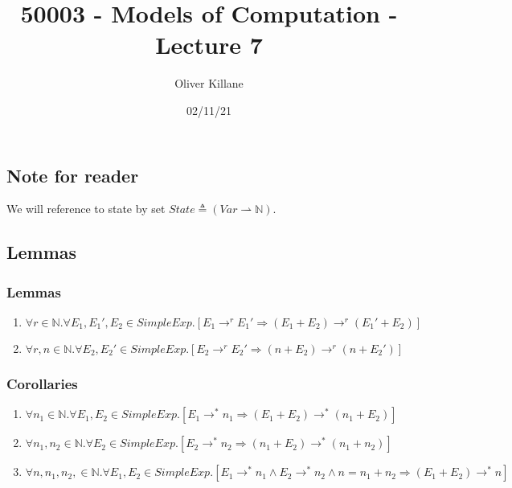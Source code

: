 \documentclass{report}
\title{50003 - Models of Computation - Lecture 7}
\author{Oliver Killane}
\date{02/11/21}
\begin{document}
\maketitle
{}

\subsection*{Note for reader}
We will reference to state by set $State \triangleq (Var \rightharpoonup \mathbb{N})$.

\subsection*{Lemmas}
\subsubsection*{Lemmas}
\begin{enumerate}
	\item $\forall r \in \mathbb{N}. \forall E_1,E_1',E_2 \in SimpleExp. [E_1 \to^r E_1' \Rightarrow (E_1 + E_2) \to^r (E_1' + E_2)]$
	\item $\forall r,n \in \mathbb{N}. \forall E_2,E_2' \in SimpleExp . [E_2 \to^r E_2' \Rightarrow (n + E_2) \to^r (n + E_2')]$
\end{enumerate}
\subsubsection*{Corollaries}
\begin{enumerate}
	\item $\forall n_1 \in \mathbb{N} . \forall E_1, E_2 \in SimpleExp . [E_1 \to^* n_1 \Rightarrow (E_1 + E_2) \to^* (n_1 + E_2)]$
	\item $\forall n_1, n_2 \in \mathbb{N} . \forall E_2 \in SimpleExp . [E_2 \to^* n_2 \Rightarrow (n_1 + E_2) \to^* (n_1 + n_2)]$
	\item $\forall n,n_1, n_2, \in \mathbb{N} . \forall E_1, E_2 \in SimpleExp . [E_1 \to^* n_1 \land E_2 \to^* n_2 \land n = n_1 + n_2 \Rightarrow (E_1 + E_2) \to^* n]$
\end{enumerate}
\end{document}
